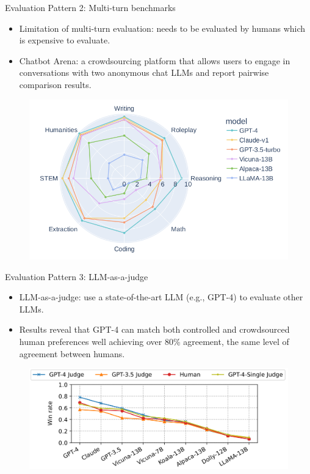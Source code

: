 \documentclass[handout]{beamer}
\begin{document}
\begin{frame}{Evaluation Pattern 2: Multi-turn benchmarks}
\begin{scriptsize}
\begin{itemize}
\item Limitation of multi-turn evaluation: needs to be evaluated by humans which is expensive to evaluate.
\item Chatbot Arena: a crowdsourcing platform that allows users to engage in conversations with two anonymous chat LLMs and report pairwise comparison results.
\end{itemize}

      \begin{figure}[h]
	\includegraphics[scale = 0.3]{pics/mtbench.png}
\end{figure}


\end{scriptsize}
\end{frame}


\begin{frame}{Evaluation Pattern 3: LLM-as-a-judge}
\begin{scriptsize}
\begin{itemize}
\item LLM-as-a-judge: use a state-of-the-art LLM (e.g., GPT-4) to evaluate other LLMs.
\item Results reveal that GPT-4 can match both controlled and crowdsourced human preferences well achieving over 80\% agreement, the same level of agreement between humans.
\end{itemize}
\end{scriptsize}

     \begin{figure}[h]
	\includegraphics[scale = 0.28]{pics/mtbenchex2.png}
\end{figure}
\end{frame}
\end{document}
